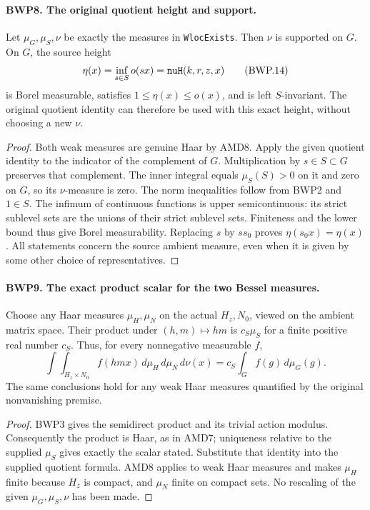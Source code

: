 \documentclass[11pt,a4paper]{article}
\numberwithin{equation}{section}
\theoremstyle{remark}\newtheorem{remark}[theorem]{Remark}
\begin{document}
\paragraph{BWP8. The original quotient height and support.}
\label{claim:BWP8}
Let \(\mu_G,\mu_S,\nu\) be exactly the measures in
\texttt{Wloc\allowbreak Exists}.  Then \(\nu\) is supported on \(G\).
On \(G\), the source height
\[
 \eta(x)=\inf_{s\in S}o(sx)=\texttt{nu\allowbreak H}(k,r,z,x)
 \tag{BWP.14}
\]
is Borel measurable, satisfies \(1\le\eta(x)\le o(x)\),
and is left \(S\)-invariant.  The original quotient identity can
therefore be used with this exact height, without choosing a new \(\nu\).

\begin{proof}
Both weak measures are genuine Haar by AMD8.  Apply the given
quotient identity to the indicator of the complement of \(G\).
Multiplication by \(s\in S\subset G\) preserves that complement.
The inner integral equals \(\mu_S(S)>0\) on it and zero on
\(G\), so its \(\nu\)-measure is zero.  The norm inequalities
follow from BWP2 and \(1\in S\).  The infimum of continuous
functions is upper semicontinuous: its strict sublevel sets are the
unions of their strict sublevel sets.  Finiteness and the lower bound
thus give Borel measurability.  Replacing \(s\) by \(ss_0\)
proves \(\eta(s_0x)=\eta(x)\).  All statements concern the
source ambient measure, even when it is given by some other choice
of representatives.
\end{proof}

\paragraph{BWP9. The exact product scalar for the two Bessel measures.}
\label{claim:BWP9}
Choose any Haar measures \(\mu_H,\mu_N\) on the actual
\(H_z,N_0\), viewed on the ambient matrix space.  Their product
under \((h,m)\mapsto hm\) is \(c_S\mu_S\) for a finite
positive real number \(c_S\).  Thus, for every nonnegative
measurable \(f\),
\[
 \int\!\int_{H_z\times N_0} f(hmx)\,d\mu_H\,d\mu_N\,d\nu(x)
 =c_S\int_G f(g)\,d\mu_G(g).
 \tag{BWP.15}
\]
The same conclusions hold for any weak Haar measures quantified by
the original nonvanishing premise.

\begin{proof}
BWP3 gives the semidirect product and its trivial action modulus.
Consequently the product is Haar, as in AMD7; uniqueness relative to
the supplied \(\mu_S\) gives exactly the scalar stated.  Substitute
that identity into the supplied quotient formula.  AMD8 applies to
weak Haar measures and makes \(\mu_H\) finite because \(H_z\)
is compact, and \(\mu_N\) finite on compact sets.  No rescaling of
the given \(\mu_G,\mu_S,\nu\) has been made.
\end{proof}
\end{document}
